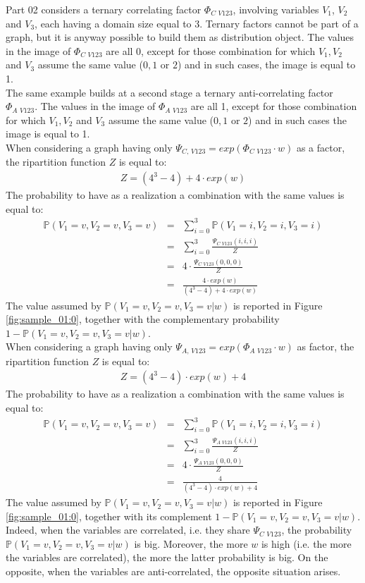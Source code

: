 Part 02 considers a ternary correlating factor $\Phi_{C\,\,V123}$, involving variables $V_1$, $V_2$ and $V_3$, each having a domain size equal to 3. Ternary factors cannot be part of a graph, but it is anyway possible to build them as distribution object.
The values in the image of $\Phi_{C\,\,V123}$ are all 0, except for those combination for which $V_1,V_2$ and $V_3$ assume the same value ($0,1$ or $2$) and in such cases, the image is equal to 1.
\\
The same example builds at a second stage a ternary anti-correlating factor $\Phi_{A\,\,V123}$. The values in the image of $\Phi_{A\,\,V123}$  are all 1, except for those combination for which $V_1,V_2$ and $V_3$ assume the same value ($0,1$ or $2$) and in such cases the image is equal to 1.
\\
When considering a graph having only $\Psi_{C,\,V123} = exp( \Phi_{C\,\,V123} \cdot w)$ as a factor, the ripartition function $Z$ is equal to:
\begin{eqnarray}
Z = (4^3 - 4) + 4 \cdot exp(w)
\end{eqnarray}
The probability to have as a realization a combination with the same values is equal to:
\begin{eqnarray}
\mathbb{P}( V_1 = v,  V_2 = v, V_3 = v ) &=& \sum _{i=0}^3 \mathbb{P}( V_1 = i,  V_2 = i, V_3 = i )  \\
&=& \sum _{i=0}^3 \frac{\Psi_{C\,\,V123}(i,i,i)}{ Z} \\
&=& 4 \cdot \frac{\Psi_{C\,\,V123}(0,0,0)}{ Z} \\
&=& \frac{4 \cdot exp(w)}{(4^3 - 4) + 4 \cdot exp(w) }
\end{eqnarray}
The value assumed by $\mathbb{P}( V_1 = v,  V_2 = v, V_3 = v | w)$  is reported in Figure \ref{fig:sample_01:0}, together with the complementary probability $1 - \mathbb{P}( V_1 = v,  V_2 = v, V_3 = v | w)$.
\\
When considering a graph having only $\Psi_{A,\,V123} = exp( \Phi_{A\,\,V123} \cdot w)$ as factor, the ripartition function $Z$ is equal to:
\begin{eqnarray}
Z = (4^3 - 4) \cdot exp(w) + 4
\end{eqnarray}
The probability to have as a realization a combination with the same values is equal to:
\begin{eqnarray}
\mathbb{P}( V_1 = v,  V_2 = v, V_3 = v ) &=& \sum _{i=0}^3 \mathbb{P}( V_1 = i,  V_2 = i, V_3 = i )  \\
&=& \sum _{i=0}^3 \frac{\Psi_{A\,\,V123}(i,i,i)}{ Z} \\
&=& 4 \cdot \frac{\Psi_{A\,\,V123}(0,0,0)}{ Z} \\
&=& \frac{4}{(4^3 - 4) \cdot exp(w) + 4 }
\end{eqnarray}
The value assumed by $\mathbb{P}( V_1 = v,  V_2 = v, V_3 = v | w)$  is reported in Figure \ref{fig:sample_01:0}, together with its complement $1 - \mathbb{P}( V_1 = v,  V_2 = v, V_3 = v | w)$.
Indeed, when the variables are correlated, i.e. they share $\Psi_{C\,\,V123}$, the probability $\mathbb{P}( V_1 = v,  V_2 = v, V_3 = v | w)$ is big. Moreover, the more $w$ is high (i.e. the more the variables are correlated), the more the latter probability is big. On the opposite, when the variables are anti-correlated, the opposite situation arises. 
